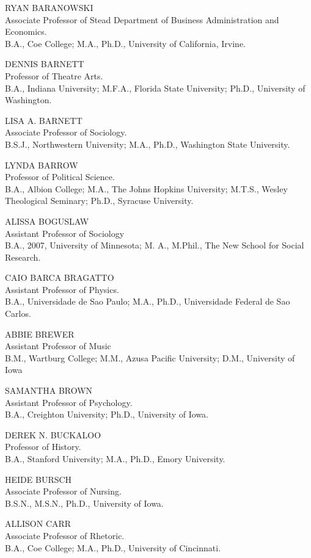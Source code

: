 \documentclass[
  letterpaper,
]{scrbook}
\begin{document}
RYAN BARANOWSKI\\
Associate Professor of Stead Department of Business Administration and
Economics.\\
B.A., Coe College; M.A., Ph.D., University of California, Irvine.

DENNIS BARNETT\\
Professor of Theatre Arts.\\
B.A., Indiana University; M.F.A., Florida State University; Ph.D.,
University of Washington.

LISA A. BARNETT\\
Associate Professor of Sociology.\\
B.S.J., Northwestern University; M.A., Ph.D., Washington State
University.

LYNDA BARROW\\
Professor of Political Science.\\
B.A., Albion College; M.A., The Johns Hopkins University; M.T.S., Wesley
Theological Seminary; Ph.D., Syracuse University.

ALISSA BOGUSLAW\\
Assistant Professor of Sociology\\
B.A., 2007, University of Minnesota; M. A., M.Phil., The New School for
Social Research.

CAIO BARCA BRAGATTO\\
Assistant Professor of Physics.\\
B.A., Universidade de Sao Paulo; M.A., Ph.D., Universidade Federal de
Sao Carlos.

ABBIE BREWER\\
Assistant Professor of Music\\
B.M., Wartburg College; M.M., Azusa Pacific University; D.M., University
of Iowa

SAMANTHA BROWN\\
Assistant Professor of Psychology.\\
B.A., Creighton University; Ph.D., University of Iowa.

DEREK N. BUCKALOO\\
Professor of History.\\
B.A., Stanford University; M.A., Ph.D., Emory University.

HEIDE BURSCH\\
Associate Professor of Nursing.\\
B.S.N., M.S.N., Ph.D., University of Iowa.

ALLISON CARR\\
Associate Professor of Rhetoric.\\
B.A., Coe College; M.A., Ph.D., University of Cincinnati.
\end{document}
